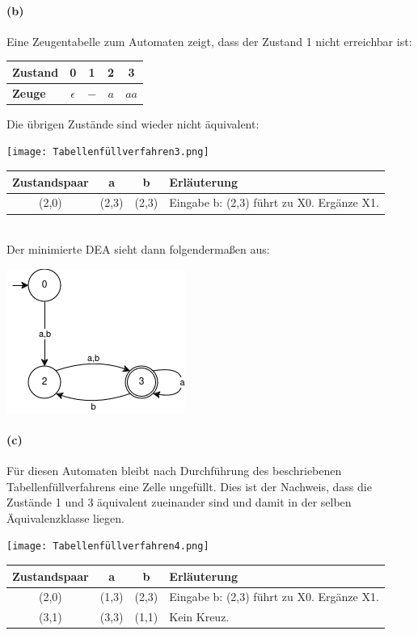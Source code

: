 \paragraph{(b)}
		Eine Zeugentabelle zum Automaten zeigt, dass der Zustand 1 nicht erreichbar ist:

		\begin{tabular}{l|c|c|c|c}
			\textbf{Zustand} & \textbf{0} & \textbf{1} & \textbf{2} & \textbf{3} \\
			\hline
			\textbf{Zeuge} & $\epsilon$ & $-$ & $a$ & $aa$ \\
		\end{tabular}

		Die übrigen Zustände sind wieder nicht äquivalent:
	
	\texttt{[image: Tabellenfüllverfahren3.png]}	
	
	\begin{tabular}{c|c|c|l}
		\textbf{Zustandspaar} & \textbf{a} & \textbf{b} & \textbf{Erläuterung} \\
		\hline
		(2,0)                 & (2,3)      & (2,3)      & Eingabe b: (2,3) führt zu X0. Ergänze X1. \\
	\end{tabular}\\
	
	Der minimierte DEA sieht dann folgendermaßen aus:
	
	\includegraphics[scale=0.75]{MiniDEA2} 

\paragraph{(c)}
	Für diesen Automaten bleibt nach Durchführung des beschriebenen Tabellenfüllverfahrens eine Zelle ungefüllt. Dies ist der Nachweis, dass die Zustände 1 und 3 äquivalent zueinander sind und damit in der selben Äquivalenzklasse liegen.

	\texttt{[image: Tabellenfüllverfahren4.png]}		
	
	\begin{tabular}{c|c|c|l}
		\textbf{Zustandspaar} & \textbf{a} & \textbf{b} & \textbf{Erläuterung} \\
		\hline
		(2,0)                 & (1,3)      & (2,3)      & Eingabe b: (2,3) führt zu X0. Ergänze X1. \\
		\hline
		(3,1)                 & (3,3)      & (1,1)      & Kein Kreuz. \\
	\end{tabular}

